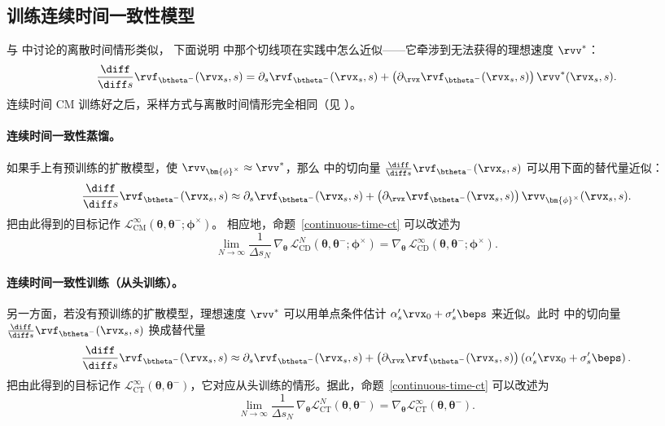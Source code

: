 \subsection{训练连续时间一致性模型}
与  中讨论的离散时间情形类似，
下面说明  中那个切线项在实践中怎么近似——它牵涉到无法获得的理想速度 $\rvv^*$：
\begin{align*}
    \frac{\diff}{\diff s}\rvf_{\btheta^-}(\rvx_s,s)
    = \partial_s \rvf_{\btheta^-}(\rvx_s,s)
    + \big(\partial_{\rvx}\rvf_{\btheta^-}(\rvx_s,s)\big)\,\rvv^*(\rvx_s,s).
\end{align*}
连续时间 CM 训练好之后，采样方式与离散时间情形完全相同（见 ）。

\paragraph{连续时间一致性蒸馏。}
如果手上有预训练的扩散模型，使
$\rvv_{\bm{\phi}^\times} \approx \rvv^*$，那么  中的切向量
$\tfrac{\diff}{\diff s}\rvf_{\btheta^-}(\rvx_s,s)$ 可以用下面的替代量近似：
\begin{align}\label{eq:cd-continuous-time}
    \frac{\diff}{\diff s}\rvf_{\btheta^-}(\rvx_s,s)
     \approx
    \partial_s \rvf_{\btheta^-}(\rvx_s,s)
    + \big(\partial_{\rvx}\rvf_{\btheta^-}(\rvx_s,s)\big)\,
      \rvv_{\bm{\phi}^\times}(\rvx_s,s).
\end{align}
把由此得到的目标记作
$\mathcal{L}^\infty_{\mathrm{CM}}(\bm{\theta},\bm{\theta}^-;\bm{\phi}^\times)$。
相应地，命题~\ref{continuous-time-ct} 可以改述为
\[
\lim_{N\to\infty}
\frac{1}{\Delta s_N}\,\nabla_{\bm{\theta}}\,
\mathcal{L}_{\mathrm{CD}}^{N}(\bm{\theta},\bm{\theta}^-;\bm{\phi}^\times)
=
\nabla_{\bm{\theta}}\,
\mathcal{L}_{\mathrm{CD}}^{\infty}(\bm{\theta},\bm{\theta}^-;\bm{\phi}^\times).
\]


\paragraph{连续时间一致性训练（从头训练）。}另一方面，若没有预训练的扩散模型，理想速度
$\rvv^*$ 可以用单点条件估计 $\alpha_s'\rvx_0 + \sigma_s'\beps$ 来近似。此时  中的切向量
$\tfrac{\diff}{\diff s}\rvf_{\btheta^-}(\rvx_s,s)$ 换成替代量
\begin{align}\label{eq:ct-continuous-time}
    \frac{\diff}{\diff s}\rvf_{\btheta^-}(\rvx_s,s)
     \approx
    \partial_s \rvf_{\btheta^-}(\rvx_s,s)
    + \big(\partial_{\rvx}\rvf_{\btheta^-}(\rvx_s,s)\big)
      \left(\alpha_s'\rvx_0 + \sigma_s'\beps\right).
\end{align}
把由此得到的目标记作
$\mathcal{L}^\infty_{\mathrm{CT}}(\bm{\theta},\bm{\theta}^-)$，它对应从头训练的情形。据此，命题~\ref{continuous-time-ct} 可以改述为
\[
\lim_{N\to\infty}
\frac{1}{\Delta s_N}\,\nabla_{\bm{\theta}}
\mathcal{L}_{\mathrm{CT}}^{N}(\bm{\theta},\bm{\theta}^-)
=
\nabla_{\bm{\theta}}
\mathcal{L}_{\mathrm{CT}}^{\infty}(\bm{\theta},\bm{\theta}^-).
\]


